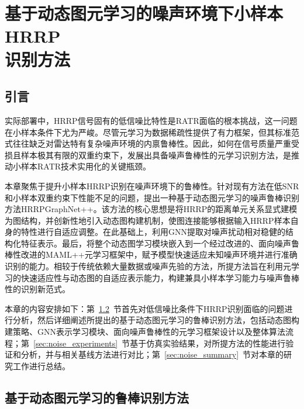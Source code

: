\chapter[基于动态图元学习的噪声环境下小样本HRRP识别方法]{基于动态图元学习的噪声环境下小样本HRRP\protect\\ 识别方法}
\label{chap:noise_robust}

\section{引言}
\label{sec:noise_intro}

实际部署中，HRRP信号固有的低信噪比特性是RATR面临的根本挑战，这一问题在小样本条件下尤为严峻。尽管元学习为数据稀疏性提供了有力框架，但其标准范式往往缺乏对雷达特有复杂噪声环境的内禀鲁棒性。因此，如何在信号质量严重受损且样本极其有限的双重约束下，发展出具备噪声鲁棒性的元学习识别方法，是推动小样本RATR技术实用化的关键瓶颈。

本章聚焦于提升小样本HRRP识别在噪声环境下的鲁棒性。针对现有方法在低SNR和小样本双重约束下性能不足的问题，提出一种基于动态图元学习的噪声鲁棒识别方法HRRPGraphNet++。该方法的核心思想是将HRRP的距离单元关系显式建模为图结构，并创新性地引入动态图构建机制，使图连接能够根据输入HRRP样本自身的特性进行自适应调整。在此基础上，利用GNN提取对噪声扰动相对稳健的结构化特征表示。最后，将整个动态图学习模块嵌入到一个经过改进的、面向噪声鲁棒性改进的MAML++元学习框架中，赋予模型快速适应未知噪声环境并进行准确识别的能力。相较于传统依赖大量数据或噪声先验的方法，所提方法旨在利用元学习的快速适应性与动态图的自适应表示能力，构建兼具小样本学习能力与噪声鲁棒性的识别新范式。

本章的内容安排如下：第~\ref{sec:noise_methodology}~节首先对低信噪比条件下HRRP识别面临的问题进行分析，然后详细阐述所提出的基于动态图元学习的鲁棒识别方法，包括动态图构建策略、GNN表示学习模块、面向噪声鲁棒性的元学习框架设计以及整体算法流程；第~\ref{sec:noise_experiments}~节基于仿真实验结果，对所提方法的性能进行验证和分析，并与相关基线方法进行对比；第~\ref{sec:noise_summary}~节对本章的研究工作进行总结。

\section{基于动态图元学习的鲁棒识别方法}
\label{sec:noise_methodology}

